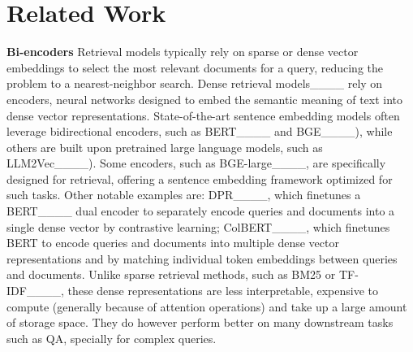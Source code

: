 \section{Related Work}
\noindent\textbf{Bi-encoders}
Retrieval models typically rely on sparse or dense vector embeddings to select the most relevant documents for a query, reducing the problem to a nearest-neighbor search.
Dense retrieval models____ rely on encoders, neural networks designed to embed the semantic meaning of text into dense vector representations.
State-of-the-art sentence embedding models often leverage bidirectional encoders, such as BERT____ and BGE____), 
while others are built upon pretrained large language models, such as LLM2Vec____). 
Some encoders, such as BGE-large____,
are specifically designed for retrieval, offering a %
sentence embedding framework optimized for such tasks.
Other notable examples are: DPR____, which finetunes a BERT____ dual encoder to separately encode queries and documents into a single dense vector by contrastive learning;
ColBERT____, which finetunes BERT to encode queries and documents into multiple dense vector representations and by matching individual token embeddings between queries and documents.
Unlike sparse retrieval methods, such as BM25 or TF-IDF____, these dense representations 
are less interpretable, expensive to compute (generally because of attention operations) and take up a large amount of storage space. They do however perform better on many downstream tasks such as QA, specially for complex queries. 

